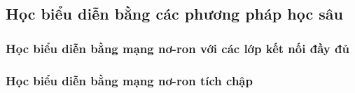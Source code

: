\subsection{Học biểu diễn bằng các phương pháp học sâu}

\subsubsection{Học biểu diễn bằng mạng nơ-ron với các lớp kết nối đầy đủ}

\subsubsection{Học biểu diễn bằng mạng nơ-ron tích chập}
